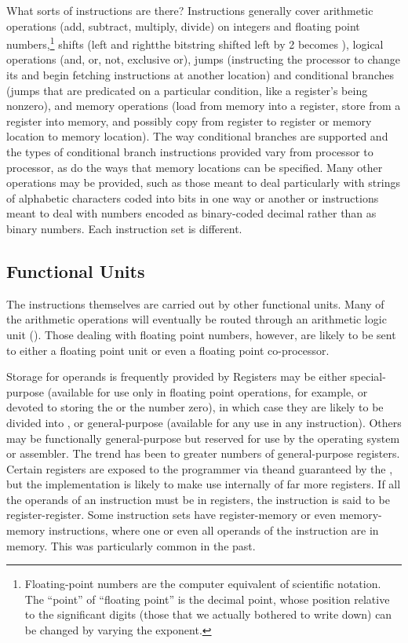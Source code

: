 What sorts of instructions are there? Instructions generally cover arithmetic operations (add, subtract, multiply, divide) on integers and floating point numbers,\footnote{Floating-point numbers are the computer equivalent of scientific notation. The ``point'' of ``floating point'' is the decimal point, whose position relative to the significant digits (those that we actually bothered to write down) can be changed by varying the exponent.} shifts (left and right\empause the bitstring  shifted left by 2 becomes ), logical operations (and, or, not, exclusive or),  jumps (instructing the processor to change its  and begin fetching instructions at another location) and conditional branches (jumps that are predicated on a particular condition, like a register's being nonzero), and memory operations (load from memory into a register, store from a register into memory, and possibly copy from register to register or memory location to memory location). The way conditional branches are supported and the types of conditional branch instructions provided vary from processor to processor, as do the ways that memory locations can be specified. Many other operations may be provided, such as those meant to deal particularly with strings of alphabetic characters coded into bits in one way or another or instructions meant to deal with numbers encoded as binary-coded decimal rather than as binary numbers. Each instruction set is different.

\subsection{Functional Units}
The instructions themselves are carried out by other functional units. Many of the arithmetic operations will eventually be routed through an arithmetic logic unit (). Those dealing with floating point numbers, however, are likely to be sent to either a floating point unit or even a floating point co-processor.

Storage for operands is frequently provided by  Registers may be either special-purpose (available for use only in floating point operations, for example, or devoted to storing the  or the number zero), in which case they are likely to be divided into , or general-purpose (available for any use in any instruction). Others may be functionally general-purpose but reserved for use by the operating system or assembler. The trend has been to greater numbers of general-purpose registers. Certain registers are exposed to the programmer via the\ISL and guaranteed by the \ISA{}, but the implementation is likely to make use internally of far more registers. If all the operands of an instruction must be in registers, the instruction is said to be register-register. Some instruction sets have register-memory or even memory-memory instructions, where one or even all operands of the instruction are in memory. This was particularly common in the past.

